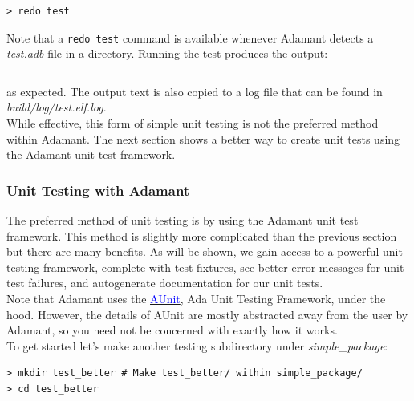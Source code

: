 \vspace{5mm} %
\begin{verbatim}
> redo test
\end{verbatim}
\vspace{5mm} %

Note that a \texttt{redo test} command is available whenever Adamant detects a \textit{test.adb} file in a directory. Running the test produces the output:

\vspace{5mm} %
\inputminted{text}{../example_architecture/simple_package/test/output.txt}
\vspace{5mm} %

as expected. The output text is also copied to a log file that can be found in \textit{build/log/test.elf.log}. \\

While effective, this form of simple unit testing is not the preferred method within Adamant. The next section shows a better way to create unit tests using the Adamant unit test framework.

\subsubsection{Unit Testing with Adamant} \label{Unit Testing with Adamant}

The preferred method of unit testing is by using the Adamant unit test framework. This method is slightly more complicated than the previous section but there are many benefits. As will be shown, we gain access to a powerful unit testing framework, complete with test fixtures, see better error messages for unit test failures, and autogenerate documentation for our unit tests. \\

Note that Adamant uses the \href{http://docs.adacore.com/live/wave/aunit/html/aunit_cb/aunit_cb.html}{\textcolor{blue}{AUnit}}, Ada Unit Testing Framework, under the hood. However, the details of AUnit are mostly abstracted away from the user by Adamant, so you need not be concerned with exactly how it works. \\

To get started let's make another testing subdirectory under \textit{simple\_package}:

\vspace{5mm} %
\begin{verbatim}
> mkdir test_better # Make test_better/ within simple_package/
> cd test_better
\end{verbatim}
\vspace{5mm} %

